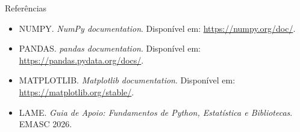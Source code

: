 \begin{frame}[t,label=referencias-ciencia-dados]{Referências}
\begin{itemize}
  \item NUMPY. \textit{NumPy documentation}. Disponível em: \url{https://numpy.org/doc/}.
  \item PANDAS. \textit{pandas documentation}. Disponível em: \url{https://pandas.pydata.org/docs/}.
  \item MATPLOTLIB. \textit{Matplotlib documentation}. Disponível em: \url{https://matplotlib.org/stable/}.
  \item LAME. \textit{Guia de Apoio: Fundamentos de Python, Estatística e Bibliotecas}. EMASC 2026.
\end{itemize}
\end{frame}
